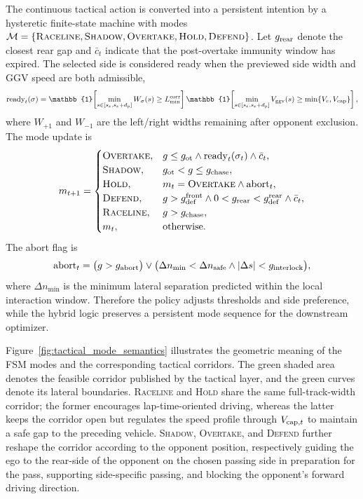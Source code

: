\documentclass{iopjournal}
\begin{document}
The continuous tactical action is converted into a persistent intention by a
hysteretic finite-state machine with modes
$\mathcal{M}=\{\textsc{Raceline},\textsc{Shadow},\textsc{Overtake},
\textsc{Hold},\textsc{Defend}\}$.  Let $g_{\rm rear}$ denote the closest
rear gap and $\bar c_t$ indicate that the post-overtake immunity window has
expired.  The selected side is considered ready when the previewed side width
and GGV speed are both admissible,
\begin{equation}
{\rm ready}_t(\sigma)=
\mathbb{1}\!\left[
\min_{s\in[s_e,s_e+d_p]} W_\sigma(s) \ge L_{\min}^{\rm corr}
\right]
\mathbb{1}\!\left[
\min_{s\in[s_e,s_e+d_p]} V_{\rm ggv}(s) \ge \min\{V_e,V_{\rm cap}\}
\right],
\label{eq:ready}
\end{equation}
where $W_{+1}$ and $W_{-1}$ are the left/right widths remaining after
opponent exclusion.  The mode update is
\begin{equation}
m_{t+1}=
\begin{cases}
\textsc{Overtake}, &
g\le g_{\rm ot}\wedge {\rm ready}_t(\sigma_t)\wedge\bar c_t,\\
\textsc{Shadow}, &
g_{\rm ot}<g\le g_{\rm chase},\\
\textsc{Hold}, &
m_t=\textsc{Overtake}\wedge{\rm abort}_t,\\
\textsc{Defend}, &
g>g_{\rm def}^{\rm front}\wedge0<g_{\rm rear}<g_{\rm def}^{\rm rear}\wedge\bar c_t,\\
\textsc{Raceline}, &
g>g_{\rm chase},\\
m_t, & \text{otherwise}.
\end{cases}
\label{eq:fsm}
\end{equation}
The abort flag is
\begin{equation}
{\rm abort}_t=
\bigl(g>g_{\rm abort}\bigr)\vee
\bigl(\Delta n_{\min}<\Delta n_{\rm safe}\wedge |\Delta s|<g_{\rm interlock}\bigr),
\label{eq:abort}
\end{equation}
where $\Delta n_{\min}$ is the minimum lateral separation predicted within
the local interaction window.  Therefore the policy adjusts thresholds and
side preference, while the hybrid logic preserves a persistent mode sequence
for the downstream optimizer.


Figure~\ref{fig:tactical_mode_semantics} illustrates the geometric meaning of the FSM modes and the corresponding tactical corridors.  The green shaded area denotes the feasible corridor published by the tactical layer, and the green curves denote its lateral boundaries.  \textsc{Raceline} and \textsc{Hold} share the same full-track-width corridor; the former encourages lap-time-oriented driving, whereas the latter keeps the corridor open but regulates the speed profile through $V_{{\rm cap},t}$ to maintain a safe gap to the preceding vehicle.  \textsc{Shadow}, \textsc{Overtake}, and \textsc{Defend} further reshape the corridor according to the opponent position, respectively guiding the ego to the rear-side of the opponent on the chosen passing side in preparation for the pass, supporting side-specific passing, and blocking the opponent's forward driving direction.
\end{document}
